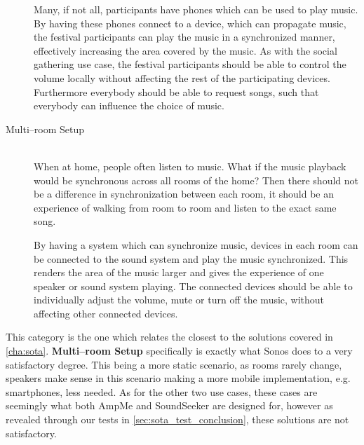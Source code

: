 \begin{description}
        Many, if not all, participants have phones which can be used to play music.
        By having these phones connect to a device, which can propagate music,
        the festival participants can play the music in a synchronized manner,
        effectively increasing the area covered by the music.
        As with the social gathering use case,
        the festival participants should be able to control the volume locally without affecting the rest of the participating devices.
        Furthermore everybody should be able to request songs, such that everybody can influence the choice of music.

    \item[Multi--room Setup] \hfill\\
        When at home, people often listen to music.
        What if the music playback would be synchronous across all rooms of the home?
        Then there should not be a difference in synchronization between each room,
        it should be an experience of walking from room to room and listen to the exact same song.

        By having a system which can synchronize music, devices in each room can be connected to the sound system and play the music synchronized.
        This renders the area of the music larger and gives the experience of one speaker or sound system playing.
        The connected devices should be able to individually adjust the volume, mute or turn off the music,
        without affecting other connected devices. 
\end{description}

This category is the one which relates the closest to the solutions covered in \cref{cha:sota}.
\textbf{Multi--room Setup} specifically is exactly what Sonos does to a very satisfactory degree.
This being a more static scenario, as rooms rarely change, speakers make sense in this scenario making a more mobile implementation, e.g. smartphones, less needed.
As for the other two use cases, these cases are seemingly what both AmpMe and SoundSeeker are designed for, however as revealed through our tests in \cref{sec:sota_test_conclusion}, these solutions are not satisfactory.
